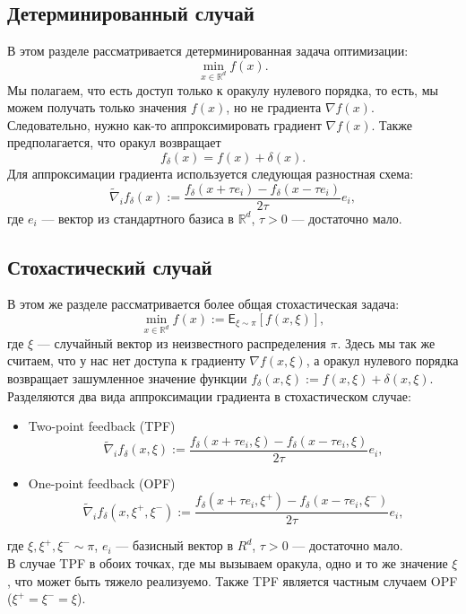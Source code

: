 \documentclass{article}
\newcommand{\R}{\mathbb{R}}
\begin{document}
\subsection{Детерминированный случай}
В этом разделе рассматривается детерминированная задача оптимизации:
\begin{equation}
 \min\limits_{x \in \R^d} f(x).
 \label{determenistic_problem}
\end{equation}
Мы полагаем, что есть доступ только к оракулу нулевого порядка, то есть, мы можем получать только значения $f(x)$, но не градиента $\nabla f(x)$. Следовательно, нужно как-то аппроксимировать градиент $\nabla f(x)$. Также предполагается, что оракул возвращает
\begin{equation}
 f_\delta (x) = f(x) + \delta (x).
\end{equation}
Для аппроксимации градиента используется следующая разностная схема:
\begin{equation}
\widetilde{\nabla}_i f_\delta (x) := \frac{f_\delta (x + \tau e_i) - f_\delta (x - \tau e_i)}{2\tau} e_i,
\label{diff_scheme}
\end{equation}
где $e_i$ --- вектор из стандартного базиса в $\R^d$, $\tau > 0$ --- достаточно мало.

\subsection{Стохастический случай}
В этом же разделе рассматривается более общая стохастическая задача:
\begin{equation}
 \min\limits_{x \in \R^d} f(x) := \mathsf{E}_{\xi \sim \pi}[f(x, \xi)],
\end{equation}
где $\xi$ --- случайный вектор из неизвестного распределения $\pi$. Здесь мы так же считаем, что у нас нет доступа к градиенту $\nabla f(x, \xi)$, а оракул нулевого порядка возвращает зашумленное значение функции $f_\delta (x, \xi) := f(x, \xi) + \delta (x, \xi)$.\\
Разделяются два вида аппроксимации градиента в стохастическом случае:
\begin{itemize}
 \item Two-point feedback (TPF)
 \begin{equation}
  \widetilde{\nabla}_i f_\delta (x, \xi) := \frac{f_\delta (x + \tau e_i, \xi) - f_\delta (x - \tau e_i, \xi)}{2\tau} e_i,
 \end{equation}
 \item One-point feedback (OPF)
 \begin{equation}
  \widetilde{\nabla}_i f_\delta (x, \xi^+, \xi^-) := \frac{f_\delta (x + \tau e_i, \xi^+) - f_\delta (x - \tau e_i, \xi^-)}{2\tau} e_i,
 \end{equation}
\end{itemize}
где $\xi, \xi^+, \xi^- \sim \pi$, $e_i$ --- базисный вектор в $R^d$, $\tau > 0$ --- достаточно мало.\\
В случае TPF в обоих точках, где мы вызываем оракула, одно и то же значение $\xi$, что может быть тяжело реализуемо. Также TPF является частным случаем OPF ($\xi^+ = \xi^- = \xi$).
\end{document}
